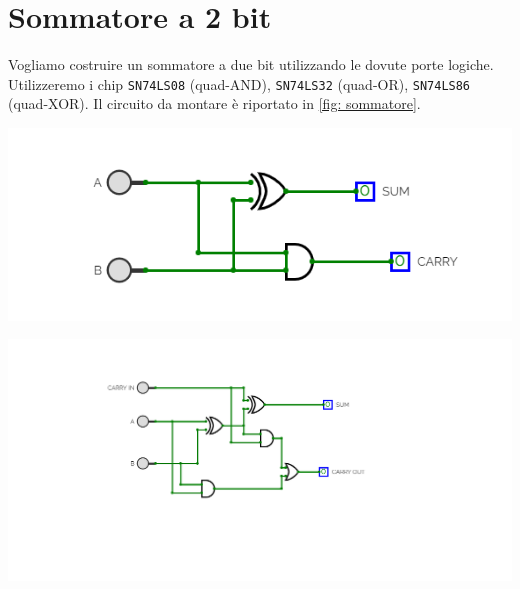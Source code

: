 \documentclass[10pt, a4paper, italian]{article}
\begin{document}
\section{Sommatore a 2 bit}
Vogliamo costruire un sommatore a due bit utilizzando le dovute porte logiche. Utilizzeremo i chip \texttt{SN74LS08} (quad-AND), \texttt{SN74LS32} (quad-OR), \texttt{SN74LS86} (quad-XOR). Il circuito da montare è riportato in \cref{fig: sommatore}.
\begin{minipage}{0.5\textwidth}
	\includegraphics[width=\linewidth]{half.png}
\end{minipage}
\begin{minipage}{0.5\textwidth}
	\includegraphics[width=\linewidth]{full.png}
\end{minipage}
\end{document}
